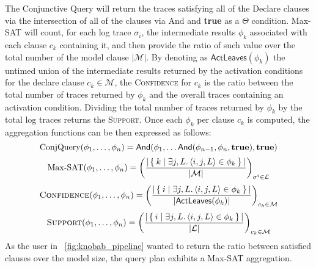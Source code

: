 The {Conjunctive Query} will return the traces satisfying all of the Declare clauses via the intersection of all of the clauses via \textsf{And} and \textbf{true} as a $\Theta$ condition. Max-SAT will count, for each log trace $\sigma_i$, the intermediate results $\phi_k$ associated with each clause $c_k$ containing it, and then provide the ratio of such value over the total number of the model clause $|\mathcal{M}|$. By denoting as $\textsf{ActLeaves}(\phi_k)$ the untimed union of the intermediate results returned by the activation conditions for the declare clause $c_k\in\mathcal{M}$, the \textsc{Confidence} for $c_k$ is the ratio between the total number of traces returned by $\phi_k$ and the overall traces containing an activation condition. Dividing the total number of traces returned by $\phi_k$ by the total log traces returns the \textsc{Support}. Once each $\phi_k$ per clause $c_k$ is computed, the aggregation functions can be then expressed as follows:
\[\textup{ConjQuery}(\phi_1,\dots,\phi_n)=\textsf{And}(\phi_1,\dots\textsf{And}(\phi_{n-1},\phi_n,\textbf{true}),\textbf{true})\]
\[\textup{Max-SAT}(\phi_1,\dots,\phi_n)=\left(\frac{|\Set{k|\exists j,L. \braket{i,j,L}\in\phi_k}|}{|\mathcal{M}|}\right)_{\sigma^i\in \mathcal{L}}\]
\[\textsc{Confidence}(\phi_1,\dots,\phi_n)=\left(\frac{|\Set{i|\exists j,L. \braket{i,j,L}\in \phi_k}|}{|\textsf{ActLeaves}(\phi_k)|}\right)_{c_k\in \mathcal{M}}\]
\[\textsc{Support}(\phi_1,\dots,\phi_n)=\left(\frac{|\Set{i|\exists j,L. \braket{i,j,L}\in \phi_k}|}{|\mathcal{L}|}\right)_{c_k\in \mathcal{M}}\]
As the user in \figurename~\ref{fig:knobab_pipeline} wanted to return the ratio between satisfied clauses over the model size, the query plan exhibits a Max-SAT aggregation.


